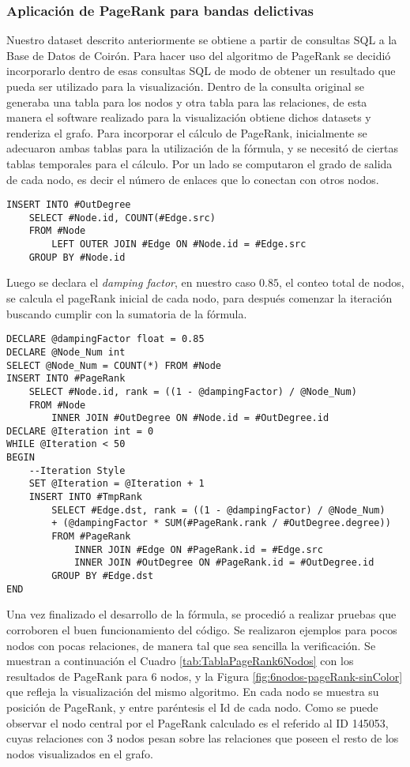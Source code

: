 \subsubsection{Aplicación de PageRank para bandas delictivas}
Nuestro dataset descrito anteriormente se obtiene a partir de consultas SQL a la Base de Datos de Coirón. Para hacer uso del algoritmo de PageRank se decidió incorporarlo dentro de esas consultas SQL de modo de obtener un resultado que pueda ser utilizado para la visualización. Dentro de la consulta original se generaba una tabla para los nodos y otra tabla para las relaciones, de esta manera el software realizado para la visualización obtiene dichos datasets y renderiza el grafo.
Para incorporar el cálculo de PageRank, inicialmente se adecuaron ambas tablas para la utilización de la fórmula, y se necesitó de ciertas tablas temporales para el cálculo. Por un lado se computaron el grado de salida de cada nodo, es decir el número de enlaces que lo conectan con otros nodos.

\begin{verbatim}
INSERT INTO #OutDegree
	SELECT #Node.id, COUNT(#Edge.src)
	FROM #Node 
		LEFT OUTER JOIN #Edge ON #Node.id = #Edge.src
	GROUP BY #Node.id		
\end{verbatim}

Luego se declara el \textit{damping factor}, en nuestro caso $0.85$, el conteo total de nodos, se calcula el pageRank inicial de cada nodo, para después comenzar la iteración buscando cumplir con la sumatoria de la fórmula.

\begin{verbatim}
DECLARE @dampingFactor float = 0.85
DECLARE @Node_Num int
SELECT @Node_Num = COUNT(*) FROM #Node
INSERT INTO #PageRank
	SELECT #Node.id, rank = ((1 - @dampingFactor) / @Node_Num)
	FROM #Node 
		INNER JOIN #OutDegree ON #Node.id = #OutDegree.id
DECLARE @Iteration int = 0
WHILE @Iteration < 50
BEGIN
	--Iteration Style
	SET @Iteration = @Iteration + 1
	INSERT INTO #TmpRank
		SELECT #Edge.dst, rank = ((1 - @dampingFactor) / @Node_Num) 
		+ (@dampingFactor * SUM(#PageRank.rank / #OutDegree.degree))
		FROM #PageRank 
			INNER JOIN #Edge ON #PageRank.id = #Edge.src
			INNER JOIN #OutDegree ON #PageRank.id = #OutDegree.id
		GROUP BY #Edge.dst
END
\end{verbatim}

Una vez finalizado el desarrollo de la fórmula, se procedió a realizar pruebas que corroboren el buen funcionamiento del código. Se realizaron ejemplos para pocos nodos con pocas relaciones, de manera tal que sea sencilla la verificación. Se muestran a continuación el Cuadro \ref{tab:TablaPageRank6Nodos} con los resultados de PageRank para 6 nodos, y la Figura \ref{fig:6nodos-pageRank-sinColor} que refleja la visualización del mismo algoritmo. En cada nodo se muestra su posición de PageRank, y entre paréntesis el Id de cada nodo. Como se puede observar el nodo central por el PageRank calculado es el referido al ID 145053, cuyas relaciones con 3 nodos pesan sobre las relaciones que poseen el resto de los nodos visualizados en el grafo.

